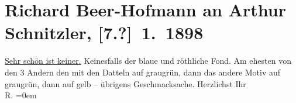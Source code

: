 

         \renewcommand{\erwaehnteOrte}{Orte: Wien}
         \renewcommand{\erwaehnteWerke}{}
               \section[Richard Beer-Hofmann an Arthur Schnitzler, {[}7.?{]} 1. 1898]{ Richard Beer-Hofmann an Arthur Schnitzler, {[}7.?{]} 1. 1898}\nopagebreak{}\rehead{ }\begin{ledgroupsized}[t]{13cm}\normalsize\beginnumbering \toendnotes[C]{\smallbreak\pagebreak[2]} 
\pstart
           \noindent{}{\pb}\uline{Sehr schön ist keiner.}\pend
           \pstart
           Keinesfalls der blaue und röthliche Fond.\pend
           \pstart
           Am ehesten  von den 3 Andern den mit den Datteln
               auf graugrün,  dann das andere Motiv auf
               graugrün, dann auf gelb – {\pb}übrigens
               Geschmacksache.\pend
           \pstart
            Herzlichst Ihr{\\[\baselineskip]}\spacefill\mbox{R.}\pend
           \leftskip=0em{}
         
         \endnumbering{}\end{ledgroupsized}  \newcommand{\dateiname}{L00760}\newcommand{\titel}{Richard Beer-Hofmann an Arthur Schnitzler, [7.?] 1. 1898}\newcommand{\editorInnen}{Martin Anton Müller und Gerd-Hermann Susen}
      